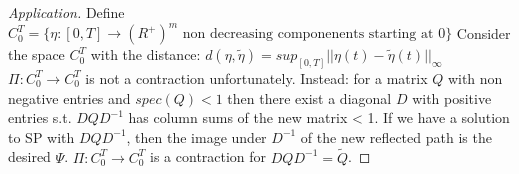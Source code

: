 \documentclass{article} \usepackage[utf8]{inputenc}
\begin{document}
  \begin{proof}[Application]
    Define
    $C_0^T = \{ \eta: [0, T] \rightarrow (R^+)^m \text{ non decreasing
      componenents starting at } 0\}$ Consider the space $C_0^T$ with
    the distance:  $d(\eta, \tilde \eta) = sup_{[0, T]} ||\eta(t) - \tilde
    \eta(t)||_{\infty}$
    $\Pi: C_0^T \rightarrow C_0^T$ is not a contraction unfortunately.
    Instead:
    for a matrix $Q$ with non negative entries and $spec(Q) < 1$ then there exist a diagonal $D$ with positive entries s.t. $DQD^{-1}$ has column sums of the new matrix < 1.
    If we have a solution to SP with $DQD^{-1}$, then the image under $D^{-1}$ of the new reflected path is the desired $\Psi$.
    $\Pi: C_0^T \rightarrow C_0^T$ is a contraction for $DQD^{-1} = \tilde Q$.
  \end{proof}
\end{document}
